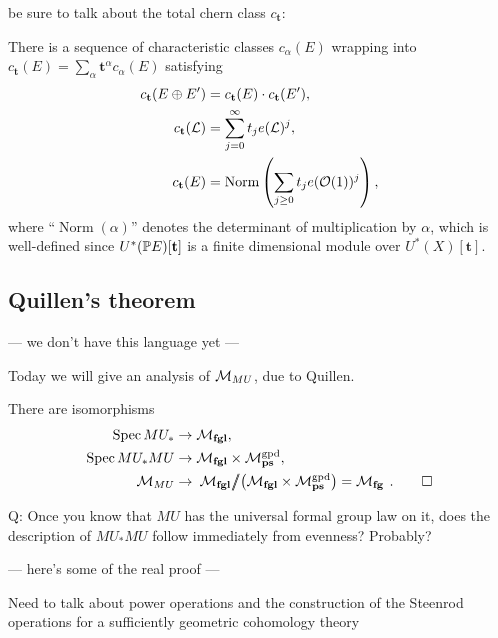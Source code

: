 be sure to talk about the total chern class $c_{\mathbf t}$:
\begin{definition}
There is a sequence of characteristic classes $c_\alpha(E)$ wrapping into $c_{\mathbf t}(E) = \sum_{\alpha} \mathbf t^\alpha c_\alpha(E)$ satisfying
\begin{align*}
c_{\mathbf t}(E \oplus E') & = c_{\mathbf t}(E) \cdot c_{\mathbf t}(E'), \\
c_{\mathbf t}(\L) & = \sum_{j=0}^\infty t_j e(\L)^j, \\
c_{\mathbf t}(E) & = \operatorname{Norm}\left( \sum_{j \ge 0} t_j e(\mathcal O(1))^j \right),
\end{align*}
where ``$\operatorname{Norm}(\alpha)$'' denotes the determinant of multiplication by $\alpha$, which is well-defined since $U^*(\P E)[\mathbf t]$ is a finite dimensional module over $U^*(X)[\mathbf t]$.
\end{definition}









\subsection*{Quillen's theorem}

--- we don't have this language yet ---

Today we will give an analysis of $\context{MU}$, due to Quillen.

\begin{theorem}[Quillen]
There are isomorphisms
\begin{align*}
\Spec MU_* & \to \moduli{fgl}, \\
\Spec MU_* MU & \to \moduli{fgl} \times \moduli{ps}^{\gpd}, \\
\context{MU} & \to \left. \left. \moduli{fgl} \middle/\!\!\!\middle/ \left( \moduli{fgl} \times \moduli{ps}^{\gpd} \right) = \moduli{fg} \right. \right. . \qed
\end{align*}
\end{theorem}

Q: Once you know that $MU$ has the universal formal group law on it, does the description of $MU_* MU$ follow immediately from evenness?  Probably?

--- here's some of the real proof ---

Need to talk about power operations and the construction of the Steenrod operations for a sufficiently geometric cohomology theory

